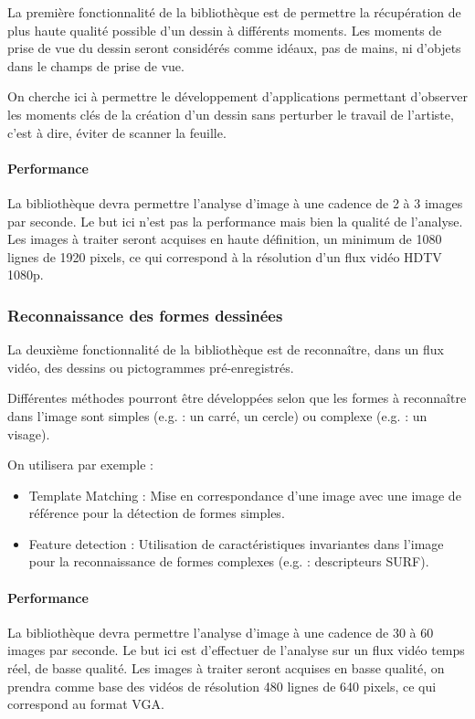 La première fonctionnalité de la bibliothèque est de permettre la récupération de plus haute qualité possible d’un dessin à différents moments. Les moments de prise de vue du dessin seront considérés comme idéaux, pas de mains, ni d'objets dans le champs de prise de vue.

On cherche ici à permettre le développement d'applications permettant d'observer les moments clés de la création d'un dessin sans perturber le travail de l'artiste, c'est à dire, éviter de scanner la feuille.

\paragraph{Performance\protect\footnotemark[1]\\}
La bibliothèque devra permettre l'analyse d'image à une cadence de 2 à 3 images par seconde. Le but ici n'est pas la performance mais bien la qualité de l'analyse.
Les images à traiter seront acquises en haute définition, un minimum de 1080 lignes de 1920 pixels, ce qui correspond à la résolution d'un flux vidéo HDTV 1080p.


\subsubsection{Reconnaissance des formes dessinées}
La deuxième fonctionnalité de la bibliothèque est de reconnaître, dans un flux vidéo, des dessins ou pictogrammes pré-enregistrés. 

Différentes méthodes pourront être développées selon que les formes à reconnaître dans l'image sont simples (e.g. : un carré, un cercle) ou complexe (e.g. : un visage).

On utilisera par exemple :

\begin{itemize}
\item Template Matching : Mise en correspondance d'une image avec une image de référence pour la détection de formes simples.
\item Feature detection : Utilisation de caractéristiques invariantes dans l'image pour la reconnaissance de formes complexes (e.g. : descripteurs SURF).
\end{itemize}

\paragraph{Performance\protect\footnotemark[1]\\}
La bibliothèque devra permettre l'analyse d'image à une cadence de 30 à 60 images par seconde. Le but ici est d'effectuer de l'analyse sur un flux vidéo temps réel, de basse qualité.
Les images à traiter seront acquises en basse qualité, on prendra comme base des vidéos de résolution 480 lignes de 640 pixels, ce qui correspond au format VGA.

